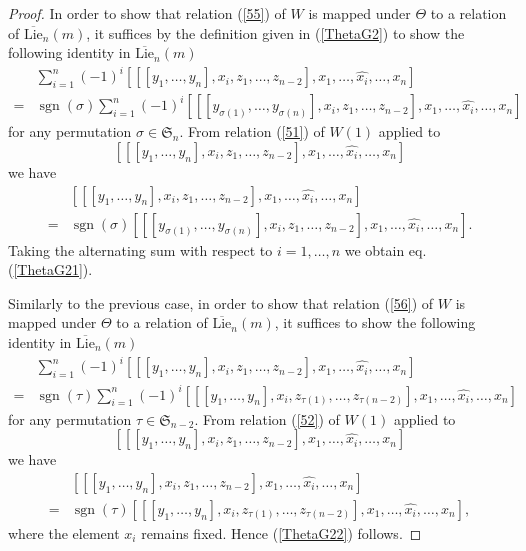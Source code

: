 \documentclass[10pt,a4paper]{amsart}
\DeclareMathOperator{\sign}{sgn}
\begin{document}
\begin{proof}
		In order to show that relation (\ref{55}) of  $W$ is mapped under $\Theta$ to a relation of $\overline{\text{Lie}}_n(m)$, it suffices by the definition given in (\ref{ThetaG2}) to show the following identity in $\overline{\text{Lie}}_n(m)$
	\begin{align}\label{ThetaG21} &\sum_{i=1}^{n}(-1)^{i}[[[y_1,\dots,y_n],x_i , z_1,\dots, z_{n-2}],x_1,\dots,\widehat{x_i},\dots, x_n] \\\nonumber=&\sign(\sigma)\sum_{i=1}^{n}(-1)^{i}[[[y_{\sigma(1)},\dots,y_{\sigma(n)}],x_i , z_1,\dots, z_{n-2}],x_1,\dots,\widehat{x_i},\dots, x_n] \end{align}
	for any permutation $\sigma \in \mathfrak{S}_n$. From relation (\ref{51}) of $W(1)$ applied to   \[[[[y_1,\dots,y_n],x_i , z_1,\dots, z_{n-2}],x_1,\dots,\widehat{x_i},\dots, x_n] \]
	we have
	\begin{align*}&[[[y_1,\dots,y_n],x_i , z_1,\dots, z_{n-2}],x_1,\dots,\widehat{x_i},\dots, x_n] \\\nonumber=& \sign(\sigma) [[[y_{\sigma(1)},\dots,y_{\sigma(n)}],x_i , z_1,\dots, z_{n-2}],x_1,\dots,\widehat{x_i},\dots, x_n]. \end{align*}
	Taking the alternating sum with respect to $i=1,\dots, n$ we obtain eq. (\ref{ThetaG21}).
	
		Similarly to the previous case, in order to show that relation (\ref{56}) of  $W$ is mapped under $\Theta$ to a relation of $\overline{\text{Lie}}_n(m)$, it suffices to show the following identity in $\overline{\text{Lie}}_n(m)$
	\begin{align}\label{ThetaG22} &\sum_{i=1}^{n}(-1)^{i}[[[y_1,\dots,y_n],x_i , z_1,\dots, z_{n-2}],x_1,\dots,\widehat{x_i},\dots, x_n] \\\nonumber=& \sign(\tau)\sum_{i=1}^{n}(-1)^{i}[[[y_{1},\dots,y_{n}],x_i , z_{\tau(1)},\dots, z_{\tau(n-2)}],x_1,\dots,\widehat{x_i},\dots, x_n] \end{align}
	for any permutation $\tau \in \mathfrak{S}_{n-2}$. From relation (\ref{52}) of $W(1)$ applied to   \[[[[y_1,\dots,y_n],x_i , z_1,\dots, z_{n-2}],x_1,\dots,\widehat{x_i},\dots, x_n] \]
	we have
	\begin{align*}&[[[y_1,\dots,y_n],x_i , z_1,\dots, z_{n-2}],x_1,\dots,\widehat{x_i},\dots, x_n] \\\nonumber=&\sign(\tau)[[[y_{1},\dots,y_{n}],x_i , z_{\tau(1)},\dots, z_{\tau(n-2)}],x_1,\dots,\widehat{x_i},\dots, x_n], \end{align*}
	where the element $x_i$ remains fixed. Hence (\ref{ThetaG22}) follows.
	

\end{proof}
\end{document}
